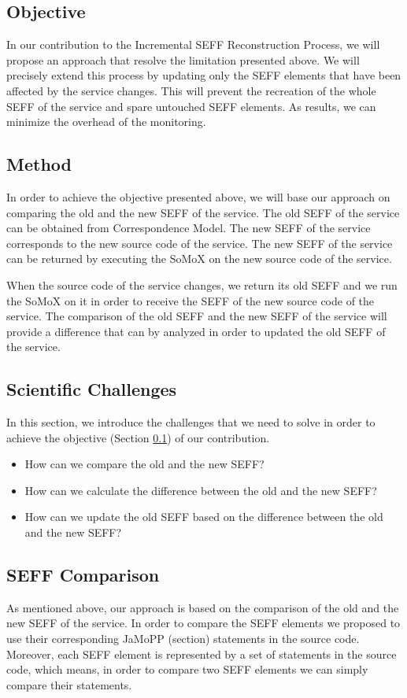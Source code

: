 \subsection{Objective}
\label{sec:objective}
In our contribution to the Incremental SEFF Reconstruction Process, we will propose an approach that resolve the limitation presented above. We will precisely extend this process by updating only the SEFF elements that have been affected by the service changes. This will prevent the recreation of the whole SEFF of the service and spare untouched SEFF elements. As results, we can minimize the overhead of the monitoring. 

\subsection{Method}
\label{sec:Method}
In order to achieve the objective presented above, we will base our approach on comparing the old and the new SEFF of the service. The old SEFF of the service can be obtained from Correspondence Model. The new SEFF of the service corresponds to the new source code of the service. The new SEFF of the service can be returned by executing the SoMoX on the new source code of the service. 

When the source code of the service changes, we return its old SEFF and we run the SoMoX on it in order to receive the SEFF of the new source code of the service. The comparison of the old SEFF and the new SEFF of the service will provide a difference that can by analyzed in order to updated the old SEFF of the service.  

\subsection{Scientific Challenges}
\label{sec:Scientific Challenges}
In this section, we introduce the challenges that we need to solve in order to achieve the objective (Section \ref{sec:objective}) of our contribution. 

\begin{itemize}
\item How can we compare the old and the new SEFF?
\item How can we calculate the difference between the old and the new SEFF?
\item How can we update the old SEFF based on the difference between the old and the new SEFF?
\end{itemize}


\subsection{SEFF Comparison}
\label{sec:SEFF Comparison}
As mentioned above, our approach is based on the comparison of the old and the new SEFF of the service. In order to compare the SEFF elements we proposed to use their corresponding JaMoPP (section) statements in the source code. Moreover, each SEFF element is represented by a set of statements in the source code, which means, in order to compare two SEFF elements we can simply compare their statements.

